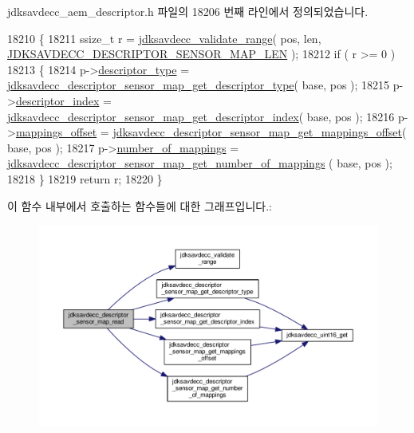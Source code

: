 jdksavdecc\+\_\+aem\+\_\+descriptor.\+h 파일의 18206 번째 라인에서 정의되었습니다.


\begin{DoxyCode}
18210 \{
18211     ssize\_t r = \hyperlink{group__util_ga9c02bdfe76c69163647c3196db7a73a1}{jdksavdecc\_validate\_range}( pos, len, 
      \hyperlink{group__descriptor__sensor__map_ga4eeb103a929997c905f5bc7233926d5f}{JDKSAVDECC\_DESCRIPTOR\_SENSOR\_MAP\_LEN} );
18212     \textcolor{keywordflow}{if} ( r >= 0 )
18213     \{
18214         p->\hyperlink{structjdksavdecc__descriptor__sensor__unit__map_ab7c32b6c7131c13d4ea3b7ee2f09b78d}{descriptor\_type} = 
      \hyperlink{group__descriptor__sensor__map_ga4784b203f4c06c4854ec6bf2d449eed7}{jdksavdecc\_descriptor\_sensor\_map\_get\_descriptor\_type}( 
      base, pos );
18215         p->\hyperlink{structjdksavdecc__descriptor__sensor__unit__map_a042bbc76d835b82d27c1932431ee38d4}{descriptor\_index} = 
      \hyperlink{group__descriptor__sensor__map_gafad365d30993d11efe48a49ce1c49e40}{jdksavdecc\_descriptor\_sensor\_map\_get\_descriptor\_index}(
       base, pos );
18216         p->\hyperlink{structjdksavdecc__descriptor__sensor__unit__map_ac91a41273e32c7bf86ca390838721642}{mappings\_offset} = 
      \hyperlink{group__descriptor__sensor__map_gac6e4f00abb9ae5f6e5fedf736cccd3b6}{jdksavdecc\_descriptor\_sensor\_map\_get\_mappings\_offset}( 
      base, pos );
18217         p->\hyperlink{structjdksavdecc__descriptor__sensor__unit__map_ac7db472c5622ef473d5d0a5c416d5531}{number\_of\_mappings} = 
      \hyperlink{group__descriptor__sensor__map_ga41f4311304413d783b5c76da6ffd533f}{jdksavdecc\_descriptor\_sensor\_map\_get\_number\_of\_mappings}
      ( base, pos );
18218     \}
18219     \textcolor{keywordflow}{return} r;
18220 \}
\end{DoxyCode}


이 함수 내부에서 호출하는 함수들에 대한 그래프입니다.\+:
\nopagebreak
\begin{figure}[H]
\begin{center}
\leavevmode
\includegraphics[width=350pt]{group__descriptor__sensor__map_ga84c9160d2779cd6d969aa6543a8329fe_cgraph}
\end{center}
\end{figure}


